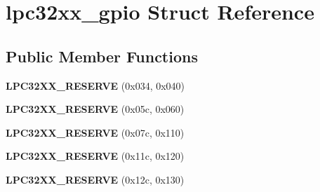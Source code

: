 \hypertarget{structlpc32xx__gpio}{}\section{lpc32xx\+\_\+gpio Struct Reference}
\label{structlpc32xx__gpio}
\subsection*{Public Member Functions}
\begin{DoxyCompactItemize}
\item 
\mbox{\label{structlpc32xx__gpio_a6631501dac00556f1994f61a09a5b8cd}} 
{\bfseries L\+P\+C32\+X\+X\+\_\+\+R\+E\+S\+E\+R\+VE} (0x034, 0x040)
\item 
\mbox{\label{structlpc32xx__gpio_ab9efe4582ee91a0ec882924b2db6f6b1}} 
{\bfseries L\+P\+C32\+X\+X\+\_\+\+R\+E\+S\+E\+R\+VE} (0x05c, 0x060)
\item 
\mbox{\label{structlpc32xx__gpio_a28661a62a4456ccc712ed863456a0a3f}} 
{\bfseries L\+P\+C32\+X\+X\+\_\+\+R\+E\+S\+E\+R\+VE} (0x07c, 0x110)
\item 
\mbox{\label{structlpc32xx__gpio_a5b719ed1381880af8f54bfe46a787c7b}} 
{\bfseries L\+P\+C32\+X\+X\+\_\+\+R\+E\+S\+E\+R\+VE} (0x11c, 0x120)
\item 
\mbox{\label{structlpc32xx__gpio_a391aaa1a0a1a00cf220578ad864643ef}} 
{\bfseries L\+P\+C32\+X\+X\+\_\+\+R\+E\+S\+E\+R\+VE} (0x12c, 0x130)
\end{DoxyCompactItemize}
